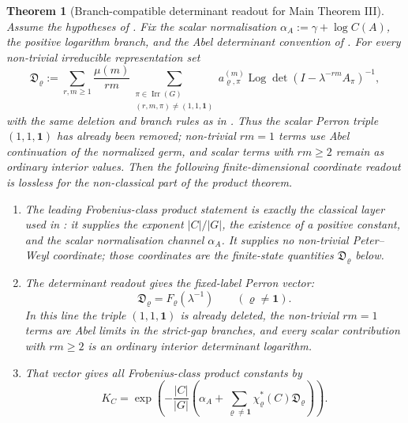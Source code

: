 \documentclass[11pt,a4paper]{amsart}
\theoremstyle{plain}
\newtheorem{theorem}{Theorem}[section]
\theoremstyle{definition}
\theoremstyle{remark}
\DeclareMathOperator{\Irr}{Irr}
\DeclareMathOperator{\Log}{Log}
\begin{document}
\begin{theorem}[Branch-compatible determinant readout for Main Theorem III]
  \label{thm:main-iii-certificate-chain}
  Assume the hypotheses of .  Fix the scalar
  normalisation \(\alpha_A:=\gamma+\log C(A)\), the positive logarithm branch,
  and the Abel determinant convention of
  .  For every non-trivial
  irreducible representation set
  \[
    \mathfrak D_\varrho
    :=
    \sum_{r,m\ge1}\frac{\mu(m)}{rm}
      \sum_{\substack{\pi\in\Irr(G)\\(r,m,\pi)\neq(1,1,\mathbf1)}}
        a_{\varrho,\pi}^{(m)}
        \Log\det(I-\lambda^{-rm}A_\pi)^{-1},
  \]
  with the same deletion and branch rules as in
  .  Thus the scalar Perron triple
  \((1,1,\mathbf1)\) has already been removed; non-trivial \(rm=1\) terms use
  Abel continuation of the normalized germ, and scalar terms with \(rm\ge2\)
  remain as ordinary interior values.  Then the following finite-dimensional coordinate readout is lossless for the
  non-classical part of the product theorem.
  \begin{enumerate}[label=\textup{(\alph*)},leftmargin=*]
    \item The leading Frobenius-class product statement is exactly the
    classical layer used in : it supplies
    the exponent \(|C|/|G|\), the existence of a positive constant, and the
    scalar normalisation channel \(\alpha_A\).  It supplies no non-trivial
    Peter--Weyl coordinate; those coordinates are the finite-state quantities
    \(\mathfrak D_\varrho\) below.
    \item The determinant readout gives the fixed-label Perron vector:
    \[
      \mathfrak D_\varrho=F_\varrho(\lambda^{-1})
      \qquad(\varrho\neq\mathbf1).
    \]
    In this line the triple \((1,1,\mathbf1)\) is already deleted, the
    non-trivial \(rm=1\) terms are Abel limits in the strict-gap branches, and
    every scalar contribution with \(rm\ge2\) is an ordinary interior
    determinant logarithm.
    \item That vector gives all Frobenius-class product constants by
    \begin{equation}\label{eq:main-iii-certificate-k-readout}
      K_C=
      \exp\!\left(
        -\frac{|C|}{|G|}
        \left(
          \alpha_A+
          \sum_{\varrho\neq\mathbf1}
            \chi_\varrho^\ast(C)\mathfrak D_\varrho
        \right)
      \right).
    \end{equation}

\end{enumerate}
\end{theorem}
\end{document}
